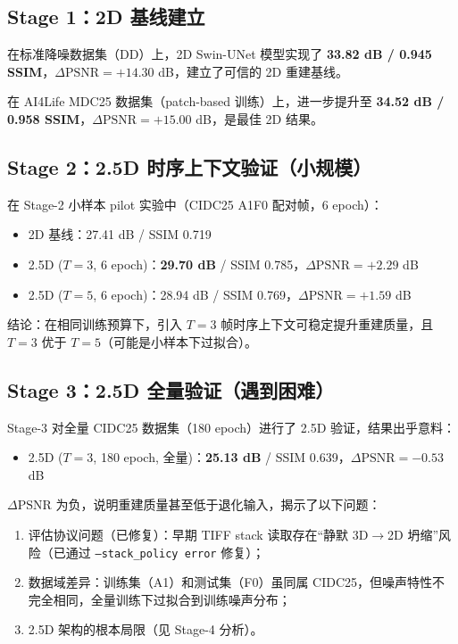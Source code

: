 \documentclass[UTF8, scheme=plain, 11pt, a4paper]{ctexart}
\begin{document}
\subsection{Stage 1：2D 基线建立}

在标准降噪数据集（DD）上，2D Swin-UNet 模型实现了 \textbf{33.82 dB / 0.945 SSIM}，$\Delta\text{PSNR} = +14.30$ dB，建立了可信的 2D 重建基线。

在 AI4Life MDC25 数据集（patch-based 训练）上，进一步提升至 \textbf{34.52 dB / 0.958 SSIM}，$\Delta\text{PSNR} = +15.00$ dB，是最佳 2D 结果。

\subsection{Stage 2：2.5D 时序上下文验证（小规模）}

在 Stage-2 小样本 pilot 实验中（CIDC25 A1F0 配对帧，6 epoch）：

\begin{itemize}
  \item 2D 基线：27.41 dB / SSIM 0.719
  \item 2.5D ($T=3$, 6 epoch)：\textbf{29.70 dB} / SSIM 0.785，$\Delta\text{PSNR} = +2.29$ dB
  \item 2.5D ($T=5$, 6 epoch)：28.94 dB / SSIM 0.769，$\Delta\text{PSNR} = +1.59$ dB
\end{itemize}

结论：在相同训练预算下，引入 $T=3$ 帧时序上下文可稳定提升重建质量，且 $T=3$ 优于 $T=5$（可能是小样本下过拟合）。

\subsection{Stage 3：2.5D 全量验证（遇到困难）}

Stage-3 对全量 CIDC25 数据集（180 epoch）进行了 2.5D 验证，结果出乎意料：
\begin{itemize}
  \item 2.5D ($T=3$, 180 epoch, 全量)：\textbf{25.13 dB} / SSIM 0.639，$\Delta\text{PSNR} = -0.53$ dB
\end{itemize}

$\Delta\text{PSNR}$ 为负，说明重建质量甚至低于退化输入，揭示了以下问题：
\begin{enumerate}
  \item 评估协议问题（已修复）：早期 TIFF stack 读取存在``静默 3D$\rightarrow$2D 坍缩''风险（已通过 \texttt{--stack\_policy error} 修复）；
  \item 数据域差异：训练集（A1）和测试集（F0）虽同属 CIDC25，但噪声特性不完全相同，全量训练下过拟合到训练噪声分布；
  \item 2.5D 架构的根本局限（见 Stage-4 分析）。
\end{enumerate}
\end{document}
